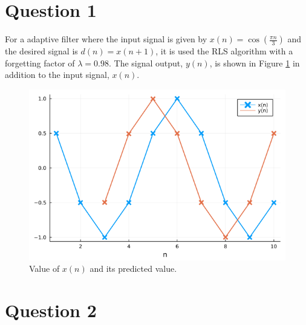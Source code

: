 \documentclass[12pt,a4paper]{article}
\begin{document}

\section{Question 1}

For a adaptive filter where the input signal is given by \(x(n) = \cos(\frac{\pi n}{3})\) and the desired signal is \(d(n) = x(n+1)\), it is used the RLS algorithm with a forgetting factor of \(\lambda = 0.98\). The signal output, \(y(n)\), is shown in Figure \ref{fig:signal-prediction} in addition to the input signal, \(x(n)\).
\begin{figure}[H]
    \centering
    \includegraphics[scale=.4]{../figs/q1.png}
    \caption{Value of \(x(n)\) and its predicted value.}
    \label{fig:signal-prediction}
\end{figure}

\section{Question 2}
\end{document}
